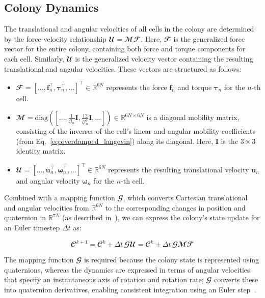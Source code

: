 \documentclass[conference]{IEEEtran}
\begin{document}
\subsection{Colony Dynamics}

The translational and angular velocities of all cells in the colony are determined by the force-velocity relationship $\mathbfcal{U} = \mathbfcal{M} \mathbfcal{F}$. Here, $\mathbfcal{F}$ is the generalized force vector for the entire colony, containing both force and torque components for each cell. Similarly, $\mathbfcal{U}$ is the generalized velocity vector containing the resulting translational and angular velocities. These vectors are structured as follows:

\begin{itemize}
    \item
          $\mathbfcal{F} = [\dots, \mathbf{f}_n^\top, \boldsymbol{\tau}_n^\top, \dots]^\top \in \mathbb{R}^{6N}$ represents the force $\mathbf{f}_n$ and torque $\boldsymbol{\tau}_n$ for the $n$-th cell.
    \item
          $\mathbfcal{M} = \text{diag}([\dots, \frac{1}{\zeta l_n}\mathbf{I}, \frac{12}{\zeta l_n^3}\mathbf{I}, \dots]) \in \mathbb{R}^{6N \times 6N}$ is a diagonal mobility matrix, consisting of the inverses of the cell's linear and angular mobility coefficients (from Eq.~\ref{eq:overdamped_langevin}) along its diagonal. Here, $\mathbf{I}$ is the $3 \times 3$ identity matrix.
    \item
          $\mathbfcal{U} = [\dots, \mathbf{u}_n^\top, \boldsymbol{\omega}_n^\top, \dots]^\top \in \mathbb{R}^{6N}$ represents the resulting translational velocity $\mathbf{u}_n$ and angular velocity $\boldsymbol{\omega}_n$ for the $n$-th cell.
\end{itemize}


Combined with a mapping function $\mathbfcal{G}$, which converts Cartesian translational and angular velocities from $\mathbb{R}^{6N}$ to the corresponding changes in position and quaternion in $\mathbb{R}^{7N}$ (as described in~\cite{Weady2024SM,Yan2022,Tasora2008}), we can express the colony's state update for an Euler timestep $\Delta t$ as:

\begin{equation} \label{eq:colony_update}
    \mathbfcal{C}^{k+1} = \mathbfcal{C}^k + \Delta t \, \mathbfcal{G} \mathbfcal{U} = \mathbfcal{C}^k + \Delta t \, \mathbfcal{G} \mathbfcal{M} \mathbfcal{F}
\end{equation}

The mapping function $\mathbfcal{G}$ is required because the colony state is represented using quaternions, whereas the dynamics are expressed in terms of angular velocities that specify an instantaneous axis of rotation and rotation rate; $\mathbfcal{G}$ converts these into quaternion derivatives, enabling consistent integration using an Euler step~\cite{Weady2024SM, Tasora2008}.
\end{document}
